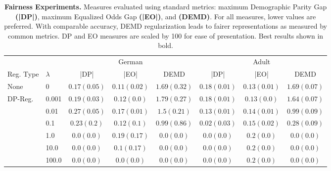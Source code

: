 \begin{table*}
	\scriptsize
	\setlength\tabcolsep{10pt} %
	\caption{\footnotesize \textbf{Fairness Experiments.} Measures evaluated using standard metrics: maximum Demographic Parity Gap \textbf{(|DP|)},  maximum Equalized Odds Gap \textbf{(|EO|)}, and \textbf{(DEMD)}. For all measures, lower values are preferred.  With comparable accuracy, DEMD regularization leads to fairer representations as measured by common metrics. DP and EO measures are scaled by 100 for ease of presentation. Best results shown in bold.}
	\begin{tabular*}{\linewidth}{ll| *{3}{c}|*{3}{c}}
		\midrule%
		& & \multicolumn{3}{c}{German} & \multicolumn{3}{c}{Adult} \\
		\cmidrule{3-5} \cmidrule{6-8}
		Reg. Type & $\lambda$ & |DP| & |EO| & DEMD & |DP| & |EO| & DEMD \\ 
		\midrule
		None & 0 & $0.17\scriptscriptstyle(0.05)$ & $0.11\scriptscriptstyle(0.02)$ & $1.69\scriptscriptstyle(0.32)$ & $0.18\scriptscriptstyle(0.01)$ & $0.13\scriptscriptstyle(0.01)$ & $1.69\scriptscriptstyle(0.07)$ \\
\midrule
DP-Reg. & 0.001 & $0.19\scriptscriptstyle(0.03)$ & $0.12\scriptscriptstyle(0.0)$ & $1.79\scriptscriptstyle(0.27)$ & $0.18\scriptscriptstyle(0.01)$ & $0.13\scriptscriptstyle(0.0)$ & $1.64\scriptscriptstyle(0.07)$ \\
	 & 0.01 & $0.27\scriptscriptstyle(0.05)$ & $0.17\scriptscriptstyle(0.01)$ & $1.5\scriptscriptstyle(0.21)$ & $0.13\scriptscriptstyle(0.01)$ & $0.14\scriptscriptstyle(0.01)$ & $0.99\scriptscriptstyle(0.09)$ \\
	 & 0.1 & $0.23\scriptscriptstyle(0.2)$ & $0.12\scriptscriptstyle(0.1)$ & $0.99\scriptscriptstyle(0.86)$ & $0.02\scriptscriptstyle(0.03)$ & $0.15\scriptscriptstyle(0.02)$ & $0.28\scriptscriptstyle(0.09)$ \\
	 & 1.0 & $0.0\scriptscriptstyle(0.0)$ & $0.19\scriptscriptstyle(0.17)$ & $0.0\scriptscriptstyle(0.0)$ & $0.0\scriptscriptstyle(0.0)$ & $0.2\scriptscriptstyle(0.0)$ & $0.0\scriptscriptstyle(0.0)$ \\
	 & 10.0 & $0.0\scriptscriptstyle(0.0)$ & $0.1\scriptscriptstyle(0.17)$ & $0.0\scriptscriptstyle(0.0)$ & $0.0\scriptscriptstyle(0.0)$ & $0.2\scriptscriptstyle(0.0)$ & $0.0\scriptscriptstyle(0.0)$ \\
	 & 100.0 & $0.0\scriptscriptstyle(0.0)$ & $0.0\scriptscriptstyle(0.0)$ & $0.0\scriptscriptstyle(0.0)$ & $0.0\scriptscriptstyle(0.0)$ & $0.2\scriptscriptstyle(0.0)$ & $0.0\scriptscriptstyle(0.0)$ \\

\end{tabular*}
\end{table*}
